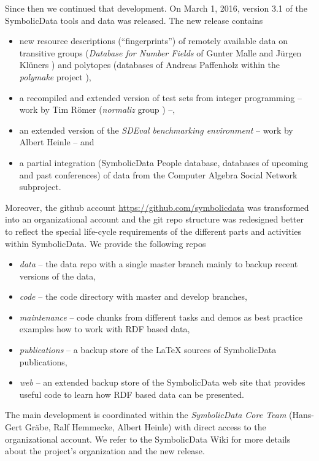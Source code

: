\documentclass[runningheads,a4paper]{llncs}
\newcommand{\SD}{{\sc Symbo\-lic\-Data}}
\begin{document}
Since then we continued that development.  On March 1, 2016, version 3.1 of
the {\SD} tools and data was released. The new release contains
\begin{itemize}
\item new resource descriptions (``fingerprints'') of remotely available data
  on transitive groups (\emph{Database for Number Fields} of Gunter Malle and
  J\"urgen Kl\"uners \cite{MalleKlueners}) and polytopes (databases of Andreas
  Paffenholz \cite{Paffenholz} within the \emph{polymake} project
  \cite{polymake}),
\item a recompiled and extended version of test sets from integer programming
  -- work by Tim R\"omer (\emph{normaliz} group \cite{normaliz}) --, 
\item an extended version of the \emph{SDEval benchmarking environment} -- work
  by Albert Heinle \cite{heinle-15} -- and
\item a partial integration ({\SD} People database, databases of upcoming and
  past conferences) of data from the Computer Algebra Social Network
  subproject.
\end{itemize}
Moreover, the github account \url{https://github.com/symbolicdata} was
transformed into an organizational account and the git repo structure was
redesigned better to reflect the special life-cycle requirements of the
different parts and activities within {\SD}. We provide the following repos
\begin{itemize}
\item \emph{data} -- the data repo with a single master branch mainly to backup
  recent versions of the data,
\item \emph{code} -- the code directory with master and develop branches,
\item \emph{maintenance} -- code chunks from different tasks and demos as best
  practice examples how to work with RDF based data,
\item \emph{publications} -- a backup store of the {\LaTeX} sources of {\SD}
  publications, 
\item \emph{web} -- an extended backup store of the {\SD} web site that
  provides useful code to learn how RDF based data can be presented.
\end{itemize}
The main development is coordinated within the \emph{{\SD} Core Team}
(Hans-Gert Gr\"abe, Ralf Hemmecke, Albert Heinle) with direct access to the
organizational account.  We refer to the {\SD} Wiki \cite{sdwiki} for more
details about the project's organization and the new release.
\end{document}

